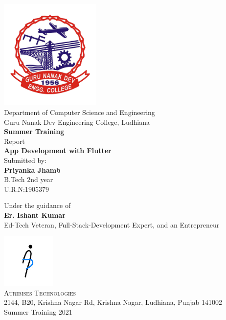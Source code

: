 \begin{titlepage}

\begin{center}
\includegraphics[width=5cm]{images/logogne.png}\\[0.5cm]
{\LARGE Department of Computer Science and Engineering}\\[0.5cm]

{\large Guru Nanak Dev Engineering College, Ludhiana}\\[1cm]
\textup{\huge {\bf Summer Training}\\ Report}\\[0.3in]

\Large \textbf {App Development with Flutter}\\[0.7in]


       

\normalsize Submitted by: \\[0.2in]
\textbf{Priyanka Jhamb}\\B.Tech 2nd year\\U.R.N:1905379

\vspace{.2in}
Under the guidance of\\[0.2in]
\textbf{Er. Ishant Kumar}\\
Ed-Tech Veteran, Full-Stack-Development Expert, and an Entrepreneur


\vspace{.3in}

\includegraphics[width=0.2\textwidth]{images/auribises.jpg}\\[0.1in]
\normalsize
\textsc{Auribises Technologies }\\
2144, B20, Krishna Nagar Rd, Krishna Nagar, Ludhiana, Punjab 141002\\
\vspace{0.2cm}
Summer Training 2021

\end{center}

\end{titlepage}
